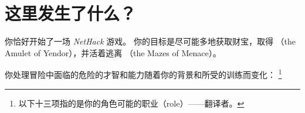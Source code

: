 \documentclass[a4paper, 10pt]{article}
\begin{document}
\section{这里发生了什么？}

你恰好开始了一场 {\it NetHack} 游戏。
你的目标是尽可能多地获取财宝，取得\zhTransAmuletOfYendor
（the Amulet of Yendor），并活着逃离\zhTransMazesOfMenace
（the Mazes of Menace）。

你处理冒险中面临的危险的才智和能力随着你的背景和所受的训练而变化：
\footnote{以下十三项指的是你的角色可能的职业（role）——翻译者。}
\end{document}
